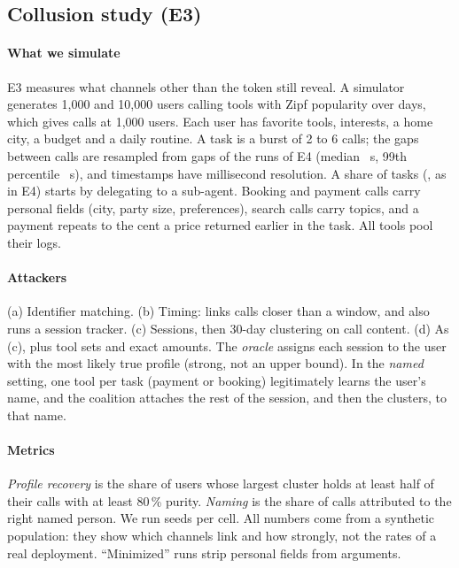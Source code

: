 \subsection{Collusion study (E3)}\label{sec:link}
\paragraph*{What we simulate} E3 measures what channels other than the token still reveal. A simulator generates 1{,}000 and 10{,}000 users calling \LinkTools{} tools with Zipf popularity over \LinkDays{} days, which gives \LinkCalls{} calls at 1{,}000 users.
Each user has favorite tools, interests, a home city, a budget and a daily routine. A task is a burst of 2 to 6 calls; the gaps between calls are resampled from \GapN{} gaps of the \sys{} runs of E4 (median \GapMedS{}~s, 99th percentile \GapNinetyNineS{}~s), and timestamps have millisecond resolution. A share of tasks (\IssPDeleg{}, as in E4) starts by delegating to a sub-agent. Booking and payment calls carry personal fields (city, party size, preferences), search calls carry topics, and a payment repeats to the cent a price returned earlier in the task.
All tools pool their logs.

\paragraph*{Attackers} (a) Identifier matching. (b) Timing: links calls closer than a window, and also runs a session tracker. (c) Sessions, then 30-day clustering on call content. (d) As (c), plus tool sets and exact amounts. The \emph{oracle} assigns each session to the user with the most likely true profile (strong, not an upper bound). In the \emph{named} setting, one tool per task (payment or booking) legitimately learns the user's name, and the coalition attaches the rest of the session, and then the clusters, to that name.

\paragraph*{Metrics} \emph{Profile recovery} is the share of users whose largest cluster holds at least half of their calls with at least 80\,\% purity. \emph{Naming} is the share of calls attributed to the right named person. We run \LinkSeeds{} seeds per cell. All numbers come from a synthetic population: they show which channels link and how strongly, not the rates of a real deployment. ``Minimized'' runs strip personal fields from arguments.

